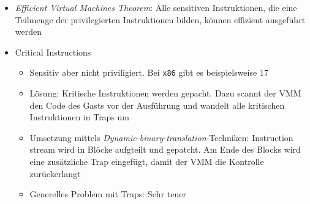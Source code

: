 \begin{itemize}
\begin{itemize}
\begin{itemize}
\begin{itemize}
\begin{itemize}
				\end{itemize}
				\item \textit{Efficient Virtual Machines Theorem}: Alle sensitiven Instruktionen, die eine Teilmenge der privilegierten Instruktionen bilden, können effizient ausgeführt werden
				\item Critical Instructions
				\begin{itemize}
					\item Sensitiv aber nicht priviligiert. Bei \texttt{x86} gibt es beispielsweise 17
					\item Lösung: Kritische Instruktionen werden gepacht. Dazu scannt der VMM den Code des Gasts vor der Ausführung und wandelt alle kritischen Instruktionen in Traps um
					\item Umsetzung mittels \textit{Dynamic-binary-translation}-Techniken: Instruction stream wird in Blöcke aufgteilt und gepatcht. Am Ende des Blocks wird eine zusätzliche Trap eingefügt, damit der VMM die Kontrolle zurückerlangt
					\item Generelles Problem mit Traps: Sehr teuer
				\end{itemize}
			\end{itemize}
		\end{itemize}
	\end{itemize}
\end{itemize}




























